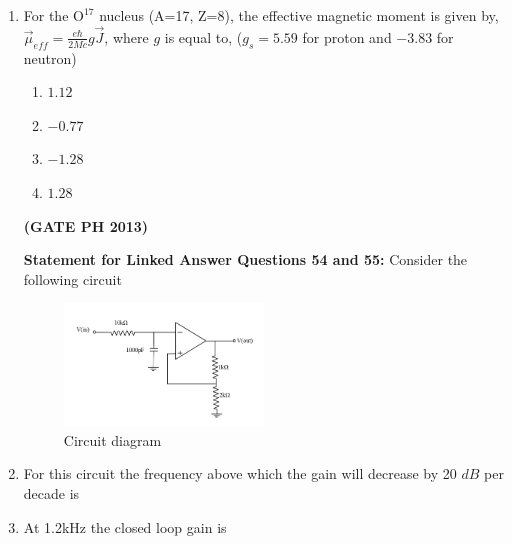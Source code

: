 \documentclass[14pt, a4paper]{extarticle}
\renewcommand{\vec}[1]{\overrightarrow{#1}}
\begin{document}
\begin{enumerate}[label=\textbf{Q. \arabic*}]
\item For the $\text{O}^{17}$ nucleus (A=17, Z=8), the effective magnetic moment is given by, $\vec{\mu}_{eff} = \frac{e\hbar}{2Mc} g \vec{J}$, where $g$ is equal to, ($g_s = 5.59$ for proton and $-3.83$ for neutron)
    \begin{multicols}{4}
        \begin{enumerate}
            \item $1.12$
            \item $-0.77$
            \item $-1.28$
            \item $1.28$
        \end{enumerate}
    \end{multicols}
    \hfill \textbf{(GATE PH 2013)}

\textbf{Statement for Linked Answer Questions 54 and 55:} Consider the following circuit
\begin{figure}[H]
\centering
\includegraphics[width=0.5\textwidth]{figs/q54fig13.png}
\caption{Circuit diagram}
\label{fig:q54_55}
\end{figure}

\item For this circuit the frequency above which the gain will decrease by 20 $dB$ per decade is
\begin{enumerate}
\end{enumerate}

\item At 1.2kHz the closed loop gain is
\begin{enumerate}
\end{enumerate}


\end{enumerate}
\end{document}
